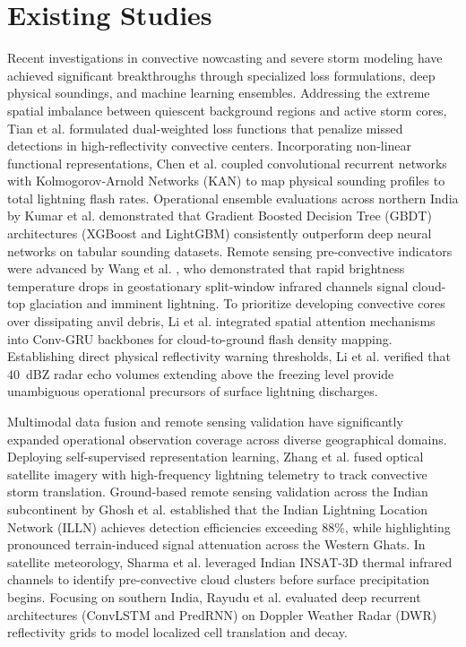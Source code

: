 \documentclass[12pt,a4paper]{report}
\begin{document}
\section{Existing Studies}
Recent investigations in convective nowcasting and severe storm modeling have achieved significant breakthroughs through specialized loss formulations, deep physical soundings, and machine learning ensembles. Addressing the extreme spatial imbalance between quiescent background regions and active storm cores, Tian et al. \cite{tian2026dual} formulated dual-weighted loss functions that penalize missed detections in high-reflectivity convective centers. Incorporating non-linear functional representations, Chen et al. \cite{chen2026clka} coupled convolutional recurrent networks with Kolmogorov-Arnold Networks (KAN) to map physical sounding profiles to total lightning flash rates. Operational ensemble evaluations across northern India by Kumar et al. \cite{kumar2026enhancing} demonstrated that Gradient Boosted Decision Tree (GBDT) architectures (XGBoost and LightGBM) consistently outperform deep neural networks on tabular sounding datasets. Remote sensing pre-convective indicators were advanced by Wang et al. \cite{wang2026infrared}, who demonstrated that rapid brightness temperature drops in geostationary split-window infrared channels signal cloud-top glaciation and imminent lightning. To prioritize developing convective cores over dissipating anvil debris, Li et al. \cite{li2026nowcasting} integrated spatial attention mechanisms into Conv-GRU backbones for cloud-to-ground flash density mapping. Establishing direct physical reflectivity warning thresholds, Li et al. \cite{li2026correlation} verified that $40$~dBZ radar echo volumes extending above the freezing level provide unambiguous operational precursors of surface lightning discharges.

Multimodal data fusion and remote sensing validation have significantly expanded operational observation coverage across diverse geographical domains. Deploying self-supervised representation learning, Zhang et al. \cite{zhang2025lightning} fused optical satellite imagery with high-frequency lightning telemetry to track convective storm translation. Ground-based remote sensing validation across the Indian subcontinent by Ghosh et al. \cite{ghosh2025assessment} established that the Indian Lightning Location Network (ILLN) achieves detection efficiencies exceeding 88\%, while highlighting pronounced terrain-induced signal attenuation across the Western Ghats. In satellite meteorology, Sharma et al. \cite{sharma2025insat} leveraged Indian INSAT-3D thermal infrared channels to identify pre-convective cloud clusters before surface precipitation begins. Focusing on southern India, Rayudu et al. \cite{rayudu2025prediction} evaluated deep recurrent architectures (ConvLSTM and PredRNN) on Doppler Weather Radar (DWR) reflectivity grids to model localized cell translation and decay.
\end{document}

